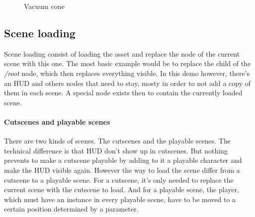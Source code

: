 \documentclass[10pt,a4paper]{article}
\begin{document}
\begin{figure}[h]
\centering
{}
\caption{Vacuum cone}
\label{fig:cone}
\end{figure}

\subsection{Scene loading}
Scene loading consist of loading the asset and replace the node of the current scene with this one. The most basic example would be to replace the child of the \textit{/root} node, which then replaces everything visible. In this demo however, there's an HUD and others nodes that need to stay, mosty in order to not add a copy of them in each scene. A special node exists then to contain the currently loaded scene.
\paragraph{Cutscenes and playable scenes}
There are two kinds of scenes. The cutscenes and the playable scenes. The technical difference is that HUD don't show up in cutscenes. But nothing prevents to make a cutscene playable by adding to it a playable character and make the HUD visible again. However the way to load the scene differ from a cutscene to a playable scene. For a cutscene, it's only needed to replace the current scene with the cutscene to load. And for a playable scene, the player, which must have an instance in every playable scene, have to be moved to a certain position determined by a parameter.
\end{document}
